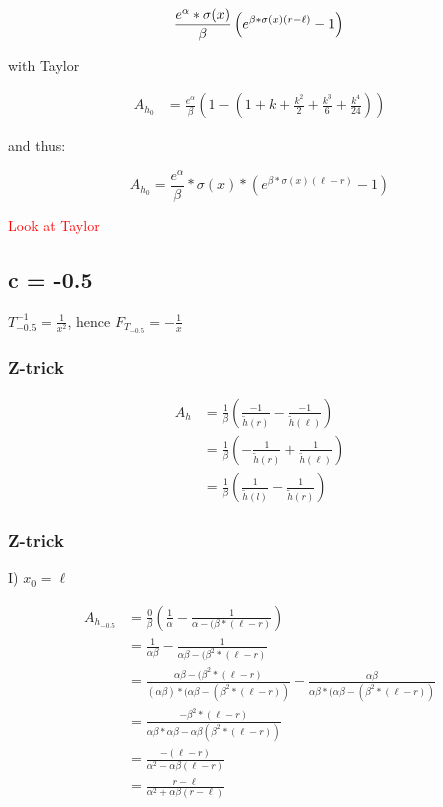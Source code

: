 \documentclass[]{article}
\begin{document}
\[
	\frac{e^{\alpha} * \sigma(x)}{\beta} \left(e^{\beta * \sigma(x) (r - \ell)} - 1 \right) \\
\]

with Taylor

\begin{align*}
	A_{h_0} &= \frac{e^{\alpha}}{\beta} \left(1 - \left(1 + k + \frac{k^2}{2} +  \frac{k^3}{6} + \frac{k^4}{24} \right) \right)
\end{align*}

and thus:

\[
	A_{h_0} = \frac{e^{\alpha}}{\beta} * \sigma(x) * \left(e^{\beta * \sigma(x) (\ell - r)} - 1 \right)
\]

\textcolor{red}{Look at Taylor}

\subsection{c = -0.5}

$T_{-0.5}^{-1} = \frac{1}{x^2}$, hence $F_{T_{-0.5}} = - \frac{1}{x}$


\subsubsection{Z-trick}


\begin{align*}
A_h &= \frac{1}{\beta} \left(\frac{-1}{\tilde{h}(r)} - \frac{-1}{\tilde{h}(\ell)} \right) \\
& = \frac{1}{\beta} \left(- \frac{1}{\tilde{h}(r)} + \frac{1}{\tilde{h}(\ell)} \right) \\
& = \frac{1}{\beta} \left(\frac{1}{\tilde{h}(l)} - \frac{1}{\tilde{h}(r)} \right)
\end{align*}

\subsubsection{Z-trick}

I) $x_0 = \ell$

\begin{align*}
	A_{h_{-0.5}} & = \frac{0}{\beta} \left(\frac{1}{\alpha} - \frac{1}{\alpha - (\beta * (\ell - r)} \right) \\
	& = \frac{1}{\alpha \beta} - \frac{1}{\alpha \beta - (\beta^2 * (\ell - r)} \\
	& = \frac{\alpha \beta - (\beta^2 * (\ell - r)}{(\alpha \beta) * (\alpha \beta - (\beta^2 * (\ell - r))} - \frac{\alpha \beta}{\alpha \beta * ( \alpha \beta - (\beta^2 * (\ell - r))} \\
	& = \frac{-\beta^2 * (\ell - r)}{\alpha \beta * \alpha \beta - \alpha \beta (\beta^2 * (\ell - r))}\\
	& = \frac{-(\ell - r)}{\alpha^2 - \alpha \beta (\ell - r)}\\
	& = \frac{r - \ell}{\alpha^2 + \alpha \beta (r - \ell)}\\
\end{align*}
\end{document}
